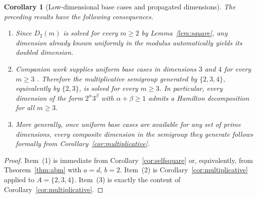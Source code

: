 \documentclass[11pt]{article}
\newtheorem{corollary}[theorem]{Corollary}
\theoremstyle{remark}
\newcommand{\torus}[2]{D_{#1}(#2)}
\begin{document}
\begin{corollary}[Low-dimensional base cases and propagated dimensions]\label{cor:examples}
The preceding results have the following consequences.
\begin{enumerate}
    \item Since $\torus{2}{m}$ is solved for every $m\ge 2$ by Lemma~\ref{lem:square}, any dimension already known uniformly in the modulus automatically yields its doubled dimension.
    \item Companion work supplies uniform base cases in dimensions $3$ and $4$ for every $m\ge 3$ \cite{ParkD3,ParkRepo2026}.
    Therefore the multiplicative semigroup generated by $\{2,3,4\}$, equivalently by $\{2,3\}$, is solved for every $m\ge 3$.
    In particular, every dimension of the form $2^\alpha 3^\beta$ with $\alpha+\beta\ge 1$ admits a Hamilton decomposition for all $m\ge 3$.
    \item More generally, once uniform base cases are available for any set of prime dimensions, every composite dimension in the semigroup they generate follows formally from Corollary~\ref{cor:multiplicative}.
\end{enumerate}
\end{corollary}

\begin{proof}
Item~(1) is immediate from Corollary~\ref{cor:selfsquare} or, equivalently, from Theorem~\ref{thm:abm} with $a=d$, $b=2$.
Item~(2) is Corollary~\ref{cor:multiplicative} applied to $A=\{2,3,4\}$.
Item~(3) is exactly the content of Corollary~\ref{cor:multiplicative}.
\end{proof}
\end{document}
